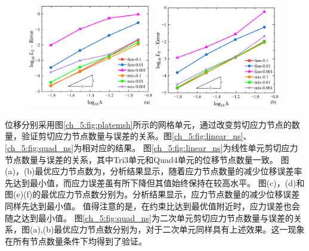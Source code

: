 \begin{figure}[!h]
    \centering
    \begin{subcaptiongroup}
    \includegraphics[width=0.49\textwidth]{figures/shearlocking/T6-l2-h.png}
    \label{T6-l2-h}
    \includegraphics[width=0.49\textwidth]{figures/shearlocking/Q8-l2-h.png}
    \label{Q8-l2-h}
    \end{subcaptiongroup}
\caption{}
\label{ch_5:eq:quad-l2}
\end{figure}

位移分别采用图\ref{ch_5:fig:platemsh}所示的网格单元，通过改变剪切应力节点的数量，验证剪切应力节点数量与误差的关系。图\ref{ch_5:fig:linear_ns}、\ref{ch_5:fig:quad_ns}为相对应的结果。
图\ref{ch_5:fig:linear_ns}为线性单元剪切应力节点数量与误差的关系，其中Tri3单元和Quad4单元的位移节点数量一致。
图(a)，(b)最优应力节点数为，分析结果显示，随着应力节点数量的减少位移误差率先达到最小值，而应力误差虽有所下降但其值始终保持在较高水平。
图(c)，(d)和图(e)(f)的最优应力节点数分别为。分析结果显示，应力节点数量的减少位移误差同样先达到最小值。
值得注意的是，在约束比达到最优值附近时，应力误差也会随之达到最小值。
图\ref{ch_5:fig:quad_ns}为二次单元剪切应力节点数量与误差的关系，图(a),(b)最优应力节点数分别为，对于二次单元同样具有上述效果。这一现象在所有节点数量条件下均得到了验证。

